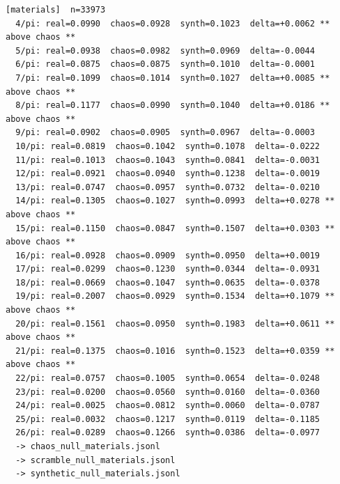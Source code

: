 \documentclass[11pt, letterpaper, openany]{book}
\begin{document}
\begin{empiricalbox}
\begin{lstlisting}[style=terminal]
[materials]  n=33973
  4/pi: real=0.0990  chaos=0.0928  synth=0.1023  delta=+0.0062 ** above chaos **
  5/pi: real=0.0938  chaos=0.0982  synth=0.0969  delta=-0.0044
  6/pi: real=0.0875  chaos=0.0875  synth=0.1010  delta=-0.0001
  7/pi: real=0.1099  chaos=0.1014  synth=0.1027  delta=+0.0085 ** above chaos **
  8/pi: real=0.1177  chaos=0.0990  synth=0.1040  delta=+0.0186 ** above chaos **
  9/pi: real=0.0902  chaos=0.0905  synth=0.0967  delta=-0.0003
  10/pi: real=0.0819  chaos=0.1042  synth=0.1078  delta=-0.0222
  11/pi: real=0.1013  chaos=0.1043  synth=0.0841  delta=-0.0031
  12/pi: real=0.0921  chaos=0.0940  synth=0.1238  delta=-0.0019
  13/pi: real=0.0747  chaos=0.0957  synth=0.0732  delta=-0.0210
  14/pi: real=0.1305  chaos=0.1027  synth=0.0993  delta=+0.0278 ** above chaos **
  15/pi: real=0.1150  chaos=0.0847  synth=0.1507  delta=+0.0303 ** above chaos **
  16/pi: real=0.0928  chaos=0.0909  synth=0.0950  delta=+0.0019
  17/pi: real=0.0299  chaos=0.1230  synth=0.0344  delta=-0.0931
  18/pi: real=0.0669  chaos=0.1047  synth=0.0635  delta=-0.0378
  19/pi: real=0.2007  chaos=0.0929  synth=0.1534  delta=+0.1079 ** above chaos **
  20/pi: real=0.1561  chaos=0.0950  synth=0.1983  delta=+0.0611 ** above chaos **
  21/pi: real=0.1375  chaos=0.1016  synth=0.1523  delta=+0.0359 ** above chaos **
  22/pi: real=0.0757  chaos=0.1005  synth=0.0654  delta=-0.0248
  23/pi: real=0.0200  chaos=0.0560  synth=0.0160  delta=-0.0360
  24/pi: real=0.0025  chaos=0.0812  synth=0.0060  delta=-0.0787
  25/pi: real=0.0032  chaos=0.1217  synth=0.0119  delta=-0.1185
  26/pi: real=0.0289  chaos=0.1266  synth=0.0386  delta=-0.0977
  -> chaos_null_materials.jsonl
  -> scramble_null_materials.jsonl
  -> synthetic_null_materials.jsonl


\end{lstlisting}
\end{empiricalbox}
\end{document}
